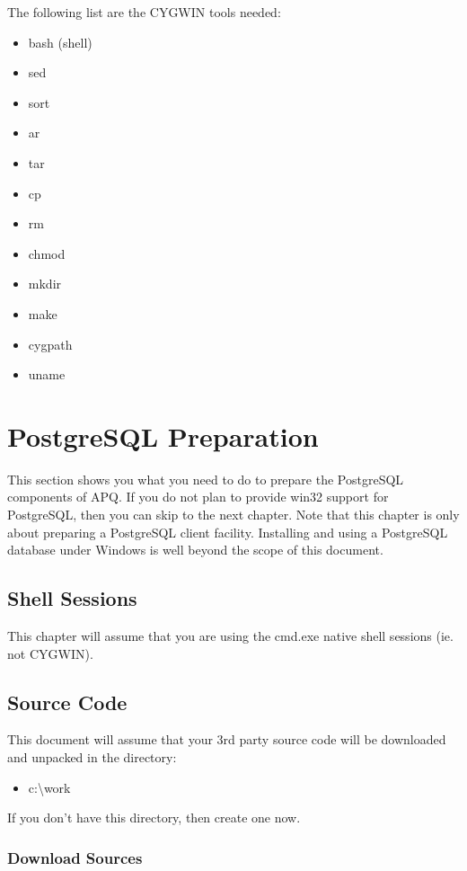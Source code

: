 \documentclass[english]{report}
\begin{document}
The following list are the CYGWIN tools needed:

\begin{itemize}
\item bash (shell)
\item sed
\item sort
\item ar
\item tar
\item cp
\item rm
\item chmod
\item mkdir
\item make
\item cygpath
\item uname
\end{itemize}

\chapter{PostgreSQL Preparation}

This section shows you what you need to do to prepare the PostgreSQL
components of APQ. If you do not plan to provide win32 support for
PostgreSQL, then you can skip to the next chapter. Note that this
chapter is only about preparing a PostgreSQL client facility. Installing
and using a PostgreSQL database under Windows is well beyond the scope
of this document.


\section{Shell Sessions}

This chapter will assume that you are using the cmd.exe native shell
sessions (ie. not CYGWIN).


\section{Source Code}

This document will assume that your 3rd party source code will be
downloaded and unpacked in the directory:

\begin{itemize}
\item c:\textbackslash{}work
\end{itemize}
If you don't have this directory, then create one now.


\subsection{Download Sources}
\end{document}
